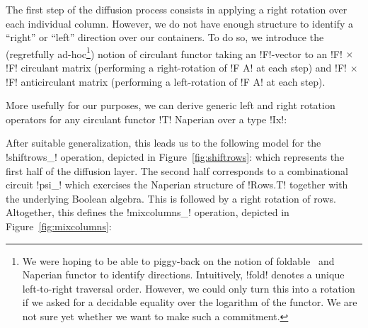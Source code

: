 \documentclass[draft,english]{jflart}
\newcommand{\ie}{\textit{i.e.}}
\begin{document}

The first step of the diffusion process consists in applying a right
rotation over each individual column. However, we do not have enough
structure to identify a ``right'' or ``left'' direction over our
containers. To do so, we introduce the (regretfully ad-hoc\footnote{We
were hoping to be able to piggy-back on the notion of
foldable~\citep{yorgey:typeclassopedia} and Naperian functor to
identify directions. Intuitively, \coqe!fold! denotes a unique
left-to-right traversal order. However, we could only turn this into a
rotation if we asked for a decidable equality over the logarithm of
the functor. We are not sure yet whether we want to make such a
commitment.}) notion of circulant functor
%
%
taking an \coqe!F!-vector to an \coqe!F! $\times$ \coqe!F! circulant
matrix (performing a right-rotation of \coqe!F A! at each step) and
\coqe!F! $\times$ \coqe!F! anticirculant matrix (performing a
left-rotation of \coqe!F A! at each step).

More usefully for our purposes, we can derive generic left and right
rotation operators for any circulant functor \coqe!T!  Naperian over a
type \coqe!Ix!:
%





After suitable generalization, this leads us to the following model
for the \coqe!shiftrows_! operation, depicted in
Figure~\ref{fig:shiftrows}:
%
%
which represents the first half of the diffusion layer.
%
%
The second half corresponds to a combinational circuit \coqe!psi_!
%
%
which exercises the Naperian structure of \coqe!Rows.T! together with
the underlying Boolean algebra. This is followed by a right rotation
of rows. Altogether, this defines the \coqe!mixcolumns_! operation,
depicted in Figure~\ref{fig:mixcolumns}:
%
\end{document}

